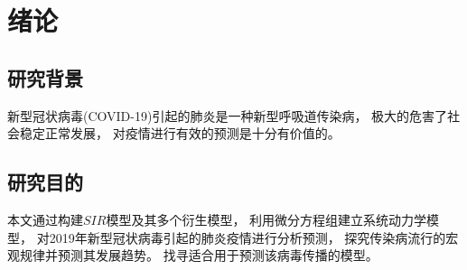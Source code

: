 \section{绪论}
\subsection{研究背景}
新型冠状病毒(COVID-19)引起的肺炎是一种新型呼吸道传染病，
极大的危害了社会稳定正常发展，
对疫情进行有效的预测是十分有价值的。
\subsection{研究目的}
本文通过构建$SIR$模型及其多个衍生模型，
利用微分方程组建立系统动力学模型，
对2019年新型冠状病毒引起的肺炎疫情进行分析预测，
探究传染病流行的宏观规律并预测其发展趋势。
找寻适合用于预测该病毒传播的模型。